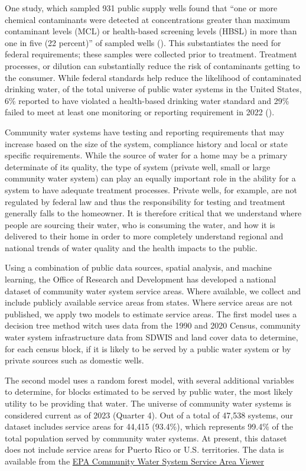 \documentclass[12pt]{article}
\begin{document}
One study, which sampled 931 public supply wells found that ``one or
more chemical contaminants were detected at concentrations greater than
maximum contaminant levels (MCL) or health-based screening levels (HBSL)
in more than one in five (22 percent)'' of sampled wells
().
This substantiates the need for federal requirements; these samples were
collected prior to treatment. Treatment processes, or dilution can
substantially reduce the risk of contaminants getting to the consumer.
While federal standards help reduce the likelihood of contaminated
drinking water, of the total universe of public water systems in the
United States, 6\% reported to have violated a health-based drinking
water standard and 29\% failed to meet at least one monitoring or
reporting requirement in 2022 ().

Community water systems have testing and reporting requirements that may
increase based on the size of the system, compliance history and local
or state specific requirements. While the source of water for a home may
be a primary determinate of its quality, the type of system (private
well, small or large community water system) can play an equally
important role in the ability for a system to have adequate treatment
processes. Private wells, for example, are not regulated by federal law
and thus the responsibility for testing and treatment generally falls to
the homeowner. It is therefore critical that we understand where people
are sourcing their water, who is consuming the water, and how it is
delivered to their home in order to more completely understand regional
and national trends of water quality and the health impacts to the
public.

Using a combination of public data sources, spatial analysis, and
machine learning, the Office of Research and Development has developed a
national dataset of community water system service areas. Where
available, we collect and include publicly available service areas from
states. Where service areas are not published, we apply two models to
estimate service areas. The first model uses a decision tree method
witch uses data from the 1990 and 2020 Census, community water system
infrastructure data from SDWIS and land cover data to determine, for
each census block, if it is likely to be served by a public water system
or by private sources such as domestic wells.

The second model uses a random forest model, with several additional
variables to determine, for blocks estimated to be served by public
water, the most likely utility to be providing that water. The universe
of community water systems is considered current as of 2023 (Quarter 4).
Out of a total of 47,538 systems, our dataset includes service areas for
44,415 (93.4\%), which represents 99.4\% of the total population served
by community water systems. At present, this dataset does not include
service areas for Puerto Rico or U.S. territories. The data is available
from the
\href{https://epa.maps.arcgis.com/apps/webappviewer/index.html?id=5a9963ca7a594fbd9b0df40050ed704e}{EPA
Community Water System Service Area Viewer}
\end{document}
